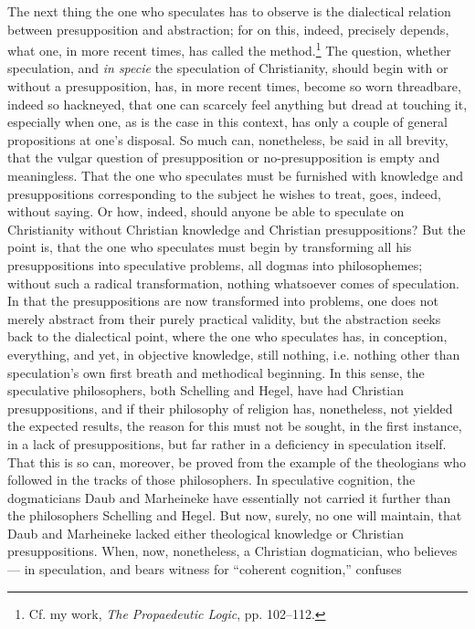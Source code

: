 \documentclass[12pt]{book}
\begin{document}
The next thing the one who speculates has to observe is the dialectical relation between presupposition and abstraction; for on this, indeed, precisely depends, what one, in
more recent times, has called the method.\footnote{Cf. my work, \textit{The Propaedeutic Logic}, pp. 102--112.} The question, whether speculation, and \textit{in specie} the speculation of Christianity, should begin with or without a presupposition, has, in more recent times, become so worn threadbare, indeed so hackneyed, that one can scarcely feel anything but dread at touching it, especially when one, as is the case in this context, has only a couple of general propositions at one's disposal. So much can, nonetheless, be said in all brevity, that the vulgar question of presupposition or no-presupposition is empty and meaningless. That the one who speculates must be furnished with knowledge and presuppositions corresponding to the subject he wishes to treat, goes, indeed, without saying. Or how, indeed, should anyone be able to speculate on Christianity without Christian knowledge and Christian presuppositions? But the point is, that the one who speculates must begin by transforming all his presuppositions into speculative problems, all dogmas into philosophemes; without such a radical transformation, nothing whatsoever comes of speculation. In that the presuppositions are now transformed into problems, one does not merely abstract from their purely practical validity, but the abstraction seeks back to the dialectical point, where the one who speculates has, in conception, everything, and yet, in objective knowledge, still nothing, i.e. nothing other than speculation's own first breath and methodical beginning. In this
sense, the speculative philosophers, both Schelling and Hegel, have had Christian presuppositions, and if their philosophy of religion has, nonetheless, not yielded the expected results, the reason for this must not be sought, in the first instance, in a lack of presuppositions, but far rather in a deficiency in speculation itself. That this is so can, moreover, be proved from the example of the theologians who followed in the tracks of those philosophers. In speculative cognition, the dogmaticians Daub and Marheineke have essentially not carried it further than the philosophers Schelling and Hegel. But now, surely, no one will maintain, that Daub and Marheineke lacked either theological knowledge or Christian presuppositions. When, now, nonetheless, a Christian dogmatician, who believes --- in speculation, and bears witness for ``coherent cognition,'' confuses
\end{document}
